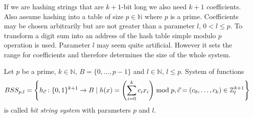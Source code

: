 If we are hashing strings that are $k + 1$-bit long we also need $k + 1$ coefficients. Also assume hashing into a table of size $p \in \mathbb{N}$ where $p$ is a prime. Coefficients may be chosen arbitrarily but are not greater than a parameter $l$, $0 < l \leq p$. To transform a digit sum into an address of the hash table simple modulo $p$ operation is used. Parameter $l$ may seem quite artificial. However it sets the range for coefficients and therefore determines the size of the whole system.

\begin{definition}
Let $p$ be a prime, $k \in \mathbb{N}$, $B = \{0, \dots, p - 1 \}$ and $l \in \mathbb{N}$, $l \leq p$. System of functions
\begin{displaymath}
BSS_{p, l} = \left\{ h_{\vec{c}}: \{0, 1\}^{k + 1} \rightarrow B \mid h(x) = \left(\displaystyle \sum_{i=0}^{k} c_i x_i\right) \bmod p, \vec{c} = (c_0, \dots, c_k)  \in \mathbb{Z}_l^{k + 1} \right\}
\end{displaymath} 
is called \emph{bit string system} with parameters $p$ and $l$.
\end{definition}


